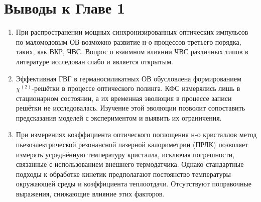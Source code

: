 \section{Выводы к Главе 1}\label{sec:review_conclusion}

\begin{enumerate}
	\item При распространении мощных синхронизированных оптических импульсов по маломодовым ОВ возможно развитие н-о процессов третьего порядка, таких, как ВКР, ЧВС. Вопрос о взаимном влиянии ЧВС различных типов в литературе исследован слабо и является открытым.
	
	\item Эффективная ГВГ в германосиликатных ОВ обусловлена формированием $\chi^{(2)}$-решётки в процессе оптического полинга. КФС измерялись лишь в стационарном состоянии, а их временная эволюция в процессе записи решётки не исследовалась. Изучение этой эволюции позволит сопоставить предсказания моделей с экспериментом и выявить их ограничения.
	
	\item При измерениях коэффициента оптического поглощения н-о кристаллов метод пьезоэлектрической резонансной лазерной калориметрии (ПРЛК) позволяет измерять усреднённую температуру кристалла, исключая погрешности, связанные с использованием внешнего термодатчика. Однако стандартные подходы к обработке кинетик предполагают постоянство температуры окружающей среды и коэффициента теплоотдачи. Отсутствуют поправочные выражения, снижающие влияние этих факторов.
\end{enumerate}

